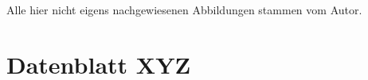 \documentclass[12pt]{report} %
\begin{document}
\setcounter{page}{\value{romanPagenumber}}


\listoffigures
Alle hier nicht eigens nachgewiesenen Abbildungen stammen vom Autor.
\clearpage


\listoftables
\clearpage


\renewcommand{\bibname}{Literatur- und Quellenverzeichnis}	%
\printbibliography[heading=bibintoc]
\clearpage


\appendix
\chapter{Datenblatt XYZ}

\end{document}

